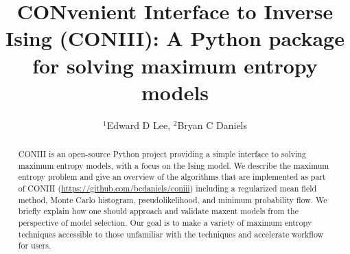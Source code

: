 \documentclass[aps,prl,twocolumn,nofootinbib]{revtex4-1}
\begin{document}
\newcommand{\mr}[1]{\mathrm{#1}}
\newcommand{\mb}[1]{\mathbf{#1}}
\newcommand{\br}[1]{\left<#1\right>}
\newcommand{\bl}[1]{\left|#1\right|}
\newcommand{\mc}[1]{\mathcal{#1}}
\newcommand{\tb}[1]{\textcolor{blue}{#1}}
\newcommand{\tr}[1]{\textcolor{red}{#1}}
\newcommand{\tg}[1]{\textcolor{green}{#1}}
\newcommand{\si}[0]{{\rm s}_{\rm i}}
\newcommand{\sj}[0]{{\rm s}_{\rm j}}
\newcommand{\bs}[1]{\boldsymbol{#1}}
\newcommand{\rs}[0]{{\rm s}}
\newcommand{\rk}[0]{{\rm k}}

\title{CONvenient Interface to Inverse Ising (CONIII): A Python package for solving maximum entropy models}
\author{$^1$Edward D Lee, $^2$Bryan C Daniels}

\begin{abstract}
CONIII is an open-source Python project providing a simple interface to solving maximum entropy models, with a focus on the Ising model. We describe the maximum entropy problem and give an overview of the algorithms that are implemented as part of CONIII (\url{https://github.com/bcdaniels/coniii}) including a regularized mean field method, Monte Carlo histogram, pseudolikelihood, and minimum probability flow. We briefly explain how one should approach and validate maxent models from the perspective of model selection. Our goal is to make a variety of maximum entropy techniques accessible to those unfamiliar with the techniques and accelerate workflow for users.
\end{abstract}

\maketitle
\end{document}
